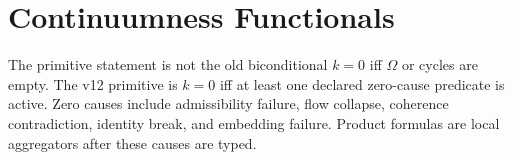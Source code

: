 \section{Continuumness Functionals}

The primitive statement is not the old biconditional \(k=0\) iff \(\Omega\) or cycles are empty.
The v12 primitive is \(k=0\) iff at least one declared zero-cause predicate is active. Zero causes
include admissibility failure, flow collapse, coherence contradiction, identity break, and embedding
failure. Product formulas are local aggregators after these causes are typed.
